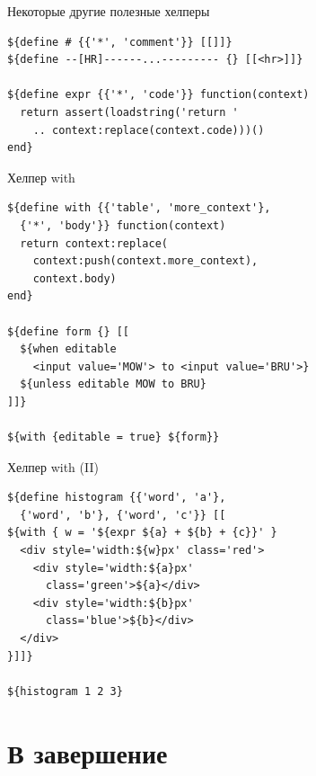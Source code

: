 \documentclass[aspectratio=169,handout,bigger]{beamer}
\begin{document}

\begin{frame}[fragile]{Некоторые другие полезные хелперы}
\begin{verbatim}
${define # {{'*', 'comment'}} [[]]}
${define --[HR]------...--------- {} [[<hr>]]}

${define expr {{'*', 'code'}} function(context)
  return assert(loadstring('return '
    .. context:replace(context.code)))()
end}
\end{verbatim}
\end{frame}


\begin{frame}[fragile]{Хелпер with}
\begin{verbatim}
${define with {{'table', 'more_context'},
  {'*', 'body'}} function(context)
  return context:replace(
    context:push(context.more_context),
    context.body)
end}

${define form {} [[
  ${when editable
    <input value='MOW'> to <input value='BRU'>}
  ${unless editable MOW to BRU}
]]}

${with {editable = true} ${form}}
\end{verbatim}
\end{frame}


\begin{frame}[fragile]{Хелпер with (II)}
\begin{verbatim}
${define histogram {{'word', 'a'},
  {'word', 'b'}, {'word', 'c'}} [[
${with { w = '${expr ${a} + ${b} + {c}}' }
  <div style='width:${w}px' class='red'>
    <div style='width:${a}px'
      class='green'>${a}</div>
    <div style='width:${b}px'
      class='blue'>${b}</div>
  </div>
}]]}

${histogram 1 2 3}
\end{verbatim}
\end{frame}

\section{В завершение}
\end{document}
